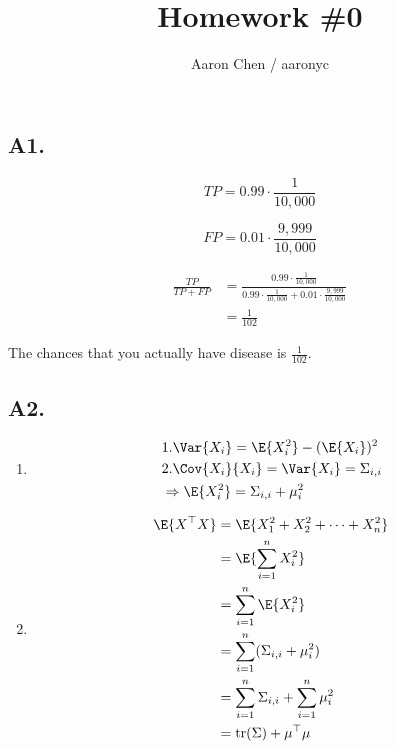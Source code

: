 \documentclass[fleqn]{article}
\begin{document}
\title{Homework \#0}
\author{Aaron Chen / aaronyc}
\date{}
\maketitle


\subsection*{A1.}

\[
TP = 0.99 \cdot \frac{1}{10{,}000}
\]

\[
FP = 0.01 \cdot \frac{9{,}999}{10{,}000}
\]

\begin{align*}
\frac{TP}{TP + FP}
&= \frac{0.99 \cdot \frac{1}{10{,}000}}
{0.99 \cdot \frac{1}{10{,}000} + 0.01 \cdot \frac{9{,}999}{10{,}000}} \\
&= \frac{1}{102}
\end{align*}

The chances that you actually have disease is $\frac{1}{102}$.


\subsection*{A2.}

\begin{enumerate}[label=(\alph*)]
\item
\begin{align*}
& 1. \Var{X_i} = \E{X_i^2} - (\E{X_i})^2 \\
& 2. \Cov{X_i}{X_i} = \Var{X_i} = \Sigma_{i,i} \\
& \Rightarrow \E{X_i^2} = \Sigma_{i,i} + \mu_i^2
\end{align*}

\item
\begin{align*}
\E{X^\top X} &= \E{X_1^2 + X_2^2 + \cdots + X_n^2} \\
             &= \E{\sum_{i=1}^{n} X_i^2} \\
             &= \sum_{i=1}^{n}\E{X_i^2} \\
             &= \sum_{i=1}^{n}(\Sigma_{i,i} + \mu_i^2) \\
             &= \sum_{i=1}^{n}\Sigma_{i,i} + \sum_{i=1}^{n}\mu_i^2 \\
             &= \operatorname{tr}(\Sigma) + \mu^\top \mu
\end{align*}
\end{enumerate}
\end{document}

